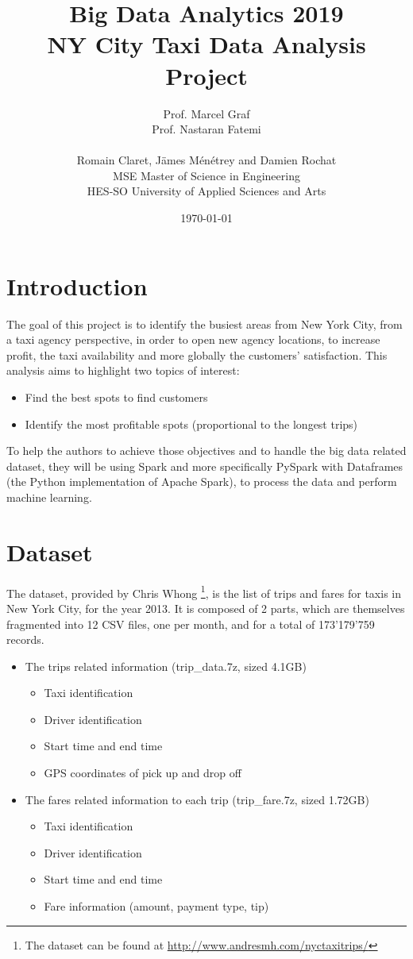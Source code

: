 \documentclass[a4paper]{article}
\title{
\Large{Big Data Analytics 2019}\\
\huge{NY City Taxi Data Analysis}\\
\large{Project}}
\author{
Prof. Marcel Graf\\
Prof. Nastaran Fatemi\\
\\
Romain Claret, Jämes Ménétrey and Damien Rochat\\
MSE Master of Science in Engineering\\
HES-SO University of Applied Sciences and Arts
\date{\today}}
\begin{document}
\maketitle

\tableofcontents
\clearpage

\section{Introduction}
The goal of this project is to identify the busiest areas from New York City, from a taxi agency perspective, in order to open new agency locations, to increase profit, the taxi availability and more globally the customers' satisfaction. This analysis aims to highlight two topics of interest:

\begin{itemize}
    \item Find the best spots to find customers
    \item Identify the most profitable spots (proportional to the longest trips)
\end{itemize}

To help the authors to achieve those objectives and to handle the big data related dataset, they will be using Spark and more specifically PySpark with Dataframes (the Python implementation of Apache Spark), to process the data and perform machine learning.


\section{Dataset}
The dataset, provided by Chris Whong \footnote{The dataset can be found at \url{http://www.andresmh.com/nyctaxitrips/}}, is the list of trips and fares for taxis in New York City, for the year 2013. It is composed of 2 parts, which are themselves fragmented into 12 CSV files, one per month, and for a total of 173'179'759 records.

\begin{itemize}
    \item The trips related information (trip\_data.7z, sized 4.1GB)
    \begin{itemize}
        \item Taxi identification
        \item Driver identification
        \item Start time and end time
        \item GPS coordinates of pick up and drop off
    \end{itemize}
    \item The fares related information to each trip (trip\_fare.7z, sized 1.72GB)
    \begin{itemize}
        \item Taxi identification
        \item Driver identification
        \item Start time and end time
        \item Fare information (amount, payment type, tip)
    \end{itemize}
\end{itemize}
\end{document}
